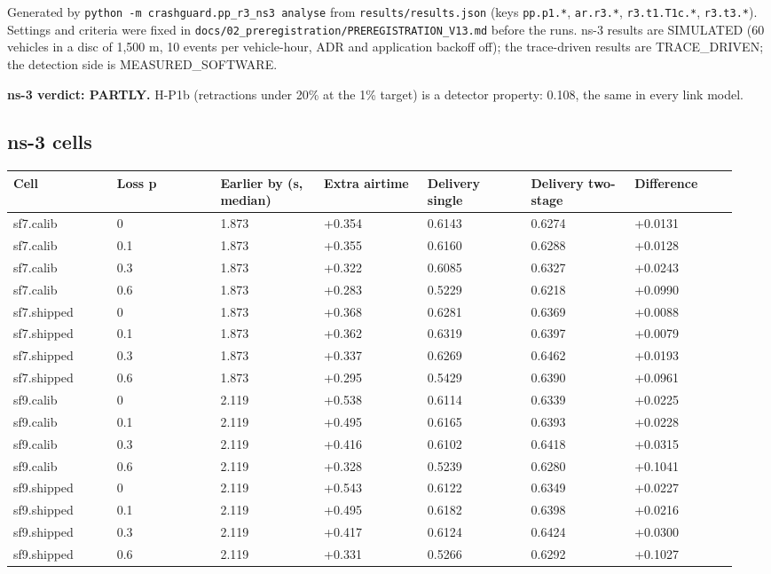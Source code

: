 


Generated by \texttt{python -m crashguard.pp\_r3\_ns3 analyse} from \texttt{results/results.json} (keys \texttt{pp.p1.*}, \texttt{ar.r3.*}, \texttt{r3.t1.T1c.*}, \texttt{r3.t3.*}). Settings and criteria were fixed in \texttt{docs/02\_preregistration/PREREGISTRATION\_V13.md} before the runs. ns-3 results are SIMULATED (60 vehicles in a disc of 1,500 m, 10 events per vehicle-hour, ADR and application backoff off); the trace-driven results are TRACE\_DRIVEN; the detection side is MEASURED\_SOFTWARE.

\textbf{ns-3 verdict: PARTLY.} H-P1b (retractions under 20\% at the 1\% target) is a detector property: 0.108, the same in every link model.

\subsection*{ns-3 cells}

{\scriptsize\raggedright
\begin{longtable}{p{0.136\linewidth}p{0.136\linewidth}p{0.136\linewidth}p{0.136\linewidth}p{0.136\linewidth}p{0.136\linewidth}p{0.136\linewidth}}
\toprule
Cell & Loss p & Earlier by (s, median) & Extra airtime & Delivery single & Delivery two-stage & Difference \\
\midrule
\endhead
sf7.calib & 0 & 1.873 & +0.354 & 0.6143 & 0.6274 & +0.0131 \\
sf7.calib & 0.1 & 1.873 & +0.355 & 0.6160 & 0.6288 & +0.0128 \\
sf7.calib & 0.3 & 1.873 & +0.322 & 0.6085 & 0.6327 & +0.0243 \\
sf7.calib & 0.6 & 1.873 & +0.283 & 0.5229 & 0.6218 & +0.0990 \\
sf7.shipped & 0 & 1.873 & +0.368 & 0.6281 & 0.6369 & +0.0088 \\
sf7.shipped & 0.1 & 1.873 & +0.362 & 0.6319 & 0.6397 & +0.0079 \\
sf7.shipped & 0.3 & 1.873 & +0.337 & 0.6269 & 0.6462 & +0.0193 \\
sf7.shipped & 0.6 & 1.873 & +0.295 & 0.5429 & 0.6390 & +0.0961 \\
sf9.calib & 0 & 2.119 & +0.538 & 0.6114 & 0.6339 & +0.0225 \\
sf9.calib & 0.1 & 2.119 & +0.495 & 0.6165 & 0.6393 & +0.0228 \\
sf9.calib & 0.3 & 2.119 & +0.416 & 0.6102 & 0.6418 & +0.0315 \\
sf9.calib & 0.6 & 2.119 & +0.328 & 0.5239 & 0.6280 & +0.1041 \\
sf9.shipped & 0 & 2.119 & +0.543 & 0.6122 & 0.6349 & +0.0227 \\
sf9.shipped & 0.1 & 2.119 & +0.495 & 0.6182 & 0.6398 & +0.0216 \\
sf9.shipped & 0.3 & 2.119 & +0.417 & 0.6124 & 0.6424 & +0.0300 \\
sf9.shipped & 0.6 & 2.119 & +0.331 & 0.5266 & 0.6292 & +0.1027 \\
\bottomrule
\end{longtable}}

